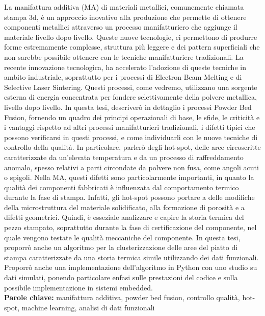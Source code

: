 La manifattura additiva (MA) di materiali metallici, comunemente chiamata stampa 3d, è un approccio inovativo alla produzione che permette di ottenere componenti metallici attraverso un processo manifatturiero che aggiunge il materiale livello dopo livello. Queste nuove tecnologie, ci permettono di produrre forme estremamente complesse, struttura più leggere e dei pattern superficiali che non sarebbe possibile ottenere con le tecniche manifatturiere tradizionali. La recente innovazione tecnologica, ha accelerato l'adozione di queste tecniche in ambito industriale, soprattutto per i processi di Electron Beam Melting e di Selective Laser Sintering. Questi processi, come vedremo, utilizzano una sorgente esterna di energia concentrata per fondere selettivamente della polvere metallica, livello dopo livello. In questa tesi, descriverò in dettaglio i processi Powder Bed Fusion, fornendo un quadro dei principi operazionali di base, le sfide, le criticità e i vantaggi rispetto ad altri processi manifatturieri tradizionali, i difetti tipici che possono verificarsi in questi processi, e come individuarli con le nuove tecniche di controllo della qualità. In particolare, parlerò degli hot-spot, delle aree circoscritte caratterizzate da un'elevata temperatura e da un processo di raffreddamento anomalo, spesso relativi a parti circondate da polvere non fusa, come angoli acuti o spigoli. Nella MA, questi difetti sono particolarmente importanti, in quanto la qualità dei componenti fabbricati è influenzata dal comportamento termico durante la fase di stampa. Infatti, gli hot-spot possono portare a delle modifiche della microstruttura del materiale solidificato, alla formazione di porosità e a difetti geometrici. Quindi, è esseziale analizzare e capire la storia termica del pezzo stampato, soprattutto durante la fase di certificazione del componente, nel quale vengono testate le qualità meccaniche del componente. In questa tesi, proporrò anche un algoritmo per la clusterizzazione delle aree del piatto di stampa caratterizzate da una storia termica simile utilizzando dei dati funzionali. Proporrò anche una implementazione dell'algoritmo in Python con uno studio su dati simulati, ponendo particolare enfasi sulle prestazioni del codice e sulla possibile implementazione in sistemi embedded.
\\[0.5cm]
\textbf{Parole chiave:} manifattura additiva, powder bed fusion, controllo qualità, hot-spot, machine learning, analisi di dati funzionali %